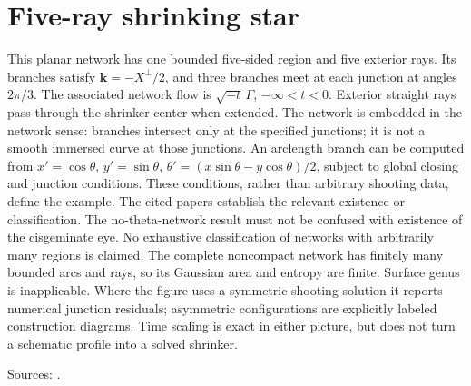 \chapter{Five-ray shrinking star}\label{sec:catalogue-network-five-ray}
\begin{example}\label{ex:catalogue-network-five-ray}
This planar network has one bounded five-sided region and five exterior rays. Its branches satisfy $\mathbf k=-X^\perp/2$, and three branches meet at each junction at angles $2\pi/3$. The associated network flow is $\sqrt{-t}\,\Gamma$, $-\infty<t<0$. Exterior straight rays pass through the shrinker center when extended. The network is embedded in the network sense: branches intersect only at the specified junctions; it is not a smooth immersed curve at those junctions.
An arclength branch can be computed from $x'=\cos\theta$, $y'=\sin\theta$, $\theta'=(x\sin\theta-y\cos\theta)/2$, subject to global closing and junction conditions. These conditions, rather than arbitrary shooting data, define the example. The cited papers establish the relevant existence or classification. The no-theta-network result must not be confused with existence of the cisgeminate eye. No exhaustive classification of networks with arbitrarily many regions is claimed.
The complete noncompact network has finitely many bounded arcs and rays, so its Gaussian area and entropy are finite. Surface genus is inapplicable. Where the figure uses a symmetric shooting solution it reports numerical junction residuals; asymmetric configurations are explicitly labeled construction diagrams. Time scaling is exact in either picture, but does not turn a schematic profile into a solved shrinker.
\par Sources: \cite{CatChang2026,CatChenGuo2007}.
\end{example}

